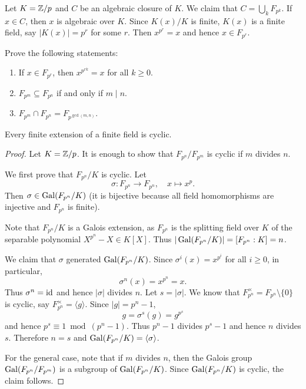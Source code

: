 Let $K=\mathbb{Z}/p$ and $C$ be an algebraic closure of $K$. 
We claim that $C=\bigcup_k F_{p^k}$. If $x\in C$, then $x$ is algebraic over $K$. 
Since $K(x)/K$ is finite, $K(x)$ is a finite field, say 
$|K(x)|=p^r$ for some $r$. Then $x^{p^r}=x$ and hence $x\in F_{p^r}$. 

\begin{exercise}
    Prove the following statements:
    \begin{enumerate}
        \item If $x\in F_{p^r}$, then $x^{p^{rk}}=x$ for all $k\geq0$.
        \item $F_{p^m}\subseteq F_{p^n}$ if and only if $m\mid n$. 
        \item $F_{p^m}\cap F_{p^n}=F_{p^{\gcd(m,n)}}$.
    \end{enumerate}
\end{exercise}

\begin{proposition}
    Every finite extension of a finite field is cyclic. 
\end{proposition}

\begin{proof}
    Let $K=\mathbb{Z}/p$. It is enough to show that $F_{p^n}/F_{p^m}$ is cyclic if $m$ divides $n$. 
    
    We first prove that $F_{p^n}/K$ is cyclic. 
    Let 
    \[
    \sigma\colon F_{p^n}\to F_{p^n},\quad 
    x\mapsto x^p.
    \]
    Then 
    $\sigma\in\operatorname{Gal}(F_{p^n}/K)$ (it is bijective because all field homomorphisms 
    are injective and $F_{p^n}$ is finite). 

    Note that 
    $F_{p^n}/K$ is a Galois extension, as $F_{p^n}$ is the splitting
    field over $K$ 
    of the separable polynomial $X^{p^n}-X\in K[X]$. 
    Thus $|\operatorname{Gal}(F_{p^n}/K)|=[F_{p^n}:K]=n$. 
    
    We claim that $\sigma$ generated $\operatorname{Gal}(F_{p^n}/K)$. Since 
    $\sigma^i(x)=x^{p^i}$ for all $i\geq 0$, in particular, 
    \[
    \sigma^n(x)=x^{p^n}=x.
    \]
    Thus $\sigma^n=\operatorname{id}$ and hence $|\sigma|$ divides $n$. Let 
    $s=|\sigma|$. We know that $F_{p^n}^{\times}=F_{p^n}\setminus\{0\}$ is
    cyclic, say $F_{p^n}^{\times}=\langle g\rangle$. Since $|g|=p^n-1$, 
    \[
    g=\sigma^s(g)=g^{p^s}
    \]
    and hence $p^s\equiv 1\bmod (p^n-1)$. Thus $p^n-1$ divides $p^s-1$ and
    hence $n$ divides $s$. Therefore $n=s$ and $\operatorname{Gal}(F_{p^n}/K)=\langle\sigma\rangle$. 
    
    For the general case, note that if $m$ divides $n$, 
    then the Galois group 
    $\operatorname{Gal}(F_{p^n}/F_{p^m})$ is a subgroup of $\operatorname{Gal}(F_{p^n}/K)$. Since  $\operatorname{Gal}(F_{p^n}/K)$ is cyclic, 
    the claim follows.
\end{proof}

